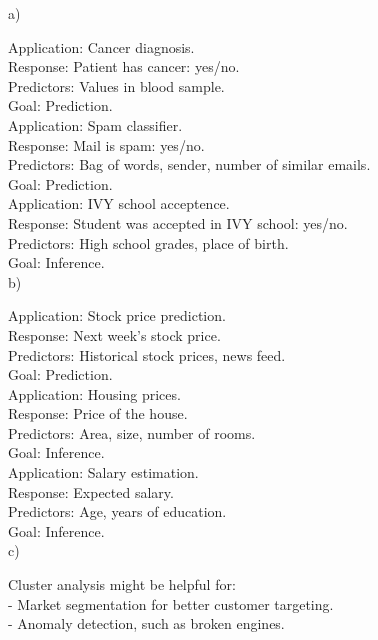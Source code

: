 \documentclass{article}
\begin{document}
a)

Application: Cancer diagnosis. \\
Response: Patient has cancer: yes/no. \\
Predictors: Values in blood sample. \\
Goal: Prediction. \\

Application: Spam classifier. \\
Response: Mail is spam: yes/no. \\
Predictors: Bag of words, sender, number of similar emails. \\
Goal: Prediction. \\

Application: IVY school acceptence. \\
Response: Student was accepted in IVY school: yes/no. \\
Predictors: High school grades, place of birth. \\
Goal: Inference. \\

b)

Application: Stock price prediction. \\
Response: Next week's stock price. \\
Predictors: Historical stock prices, news feed. \\
Goal: Prediction. \\

Application: Housing prices. \\
Response: Price of the house. \\
Predictors: Area, size, number of rooms. \\
Goal: Inference. \\

Application: Salary estimation. \\
Response: Expected salary. \\
Predictors: Age, years of education. \\
Goal: Inference. \\

c)

Cluster analysis might be helpful for: \\
 - Market segmentation for better customer targeting. \\
 - Anomaly detection, such as broken engines. \\

\section{}
\end{document}
